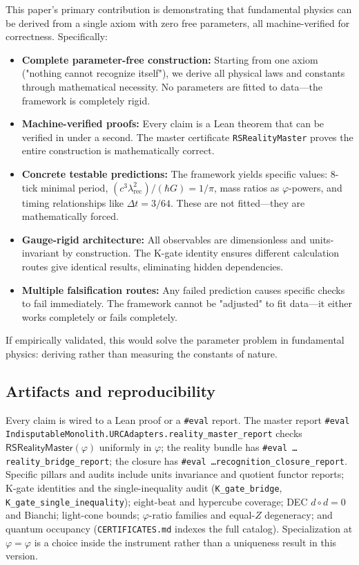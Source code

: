 \documentclass[11pt,a4paper,twoside]{article}
\numberwithin{equation}{section}
\newcommand{\phigr}{\varphi} %
\renewcommand{\phi}{\varphi}
\theoremstyle{customthm}
\theoremstyle{customdef}
\theoremstyle{customrem}
\begin{document}
This paper's primary contribution is demonstrating that fundamental physics can be derived from a single axiom with zero free parameters, all machine-verified for correctness. Specifically:
\begin{itemize}
  \item \textbf{Complete parameter-free construction:} Starting from one axiom ("nothing cannot recognize itself"), we derive all physical laws and constants through mathematical necessity. No parameters are fitted to data—the framework is completely rigid.
  \item \textbf{Machine-verified proofs:} Every claim is a Lean theorem that can be verified in under a second. The master certificate \texttt{RSRealityMaster} proves the entire construction is mathematically correct.
  \item \textbf{Concrete testable predictions:} The framework yields specific values: 8-tick minimal period, $(c^3\lambda_{\mathrm{rec}}^2)/(\hbar G) = 1/\pi$, mass ratios as $\varphi$-powers, and timing relationships like $\Delta t = 3/64$. These are not fitted—they are mathematically forced.
  \item \textbf{Gauge-rigid architecture:} All observables are dimensionless and units-invariant by construction. The K-gate identity ensures different calculation routes give identical results, eliminating hidden dependencies.
  \item \textbf{Multiple falsification routes:} Any failed prediction causes specific checks to fail immediately. The framework cannot be "adjusted" to fit data—it either works completely or fails completely.
\end{itemize}
If empirically validated, this would solve the parameter problem in fundamental physics: deriving rather than measuring the constants of nature.

\subsection{Artifacts and reproducibility}

Every claim is wired to a Lean proof or a \texttt{\#eval} report. The master report \texttt{\#eval IndisputableMonolith.URCAdapters.reality\_master\_report} checks \(\mathsf{RSRealityMaster}(\phi)\) uniformly in $\phi$; the reality bundle has \texttt{\#eval \dots reality\_bridge\_report}; the closure has \texttt{\#eval \dots recognition\_closure\_report}. Specific pillars and audits include units invariance and quotient functor reports; K-gate identities and the single-inequality audit (\texttt{K\_gate\_bridge}, \texttt{K\_gate\_single\_inequality}); eight-beat and hypercube coverage; DEC \(d\circ d=0\) and Bianchi; light-cone bounds; $\varphi$-ratio families and equal-\(Z\) degeneracy; and quantum occupancy (\texttt{CERTIFICATES.md} indexes the full catalog). Specialization at $\varphi=\phigr$ is a choice inside the instrument rather than a uniqueness result in this version.
\end{document}
